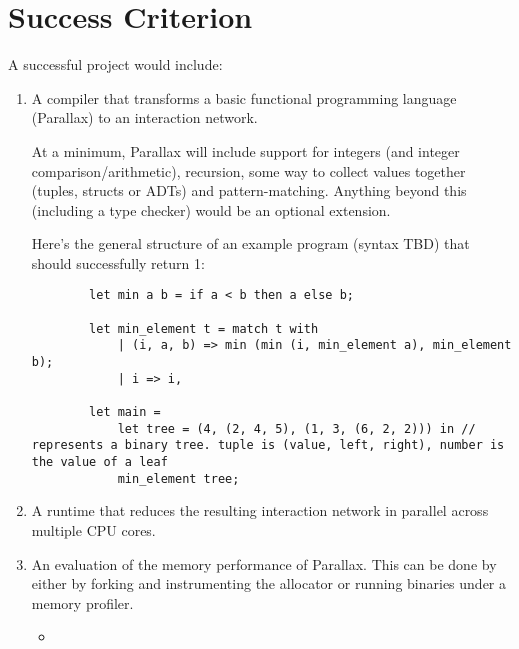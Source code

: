 \documentclass{article}
\newcommand{\Name}{Parallax}
\begin{document}
\section{Success Criterion}
A successful project would include:
\begin{enumerate}
    \item A compiler that transforms a basic functional programming language (\Name{}) to an interaction network.

    At a minimum, Parallax will include support for integers (and integer comparison/arithmetic), recursion, some way to collect values together (tuples, structs or ADTs) and pattern-matching. Anything beyond this (including a type checker) would be an optional extension.
    
    Here's the general structure of an example program (syntax TBD) that should successfully return 1:

    \begin{verbatim}
        let min a b = if a < b then a else b;
    
        let min_element t = match t with
            | (i, a, b) => min (min (i, min_element a), min_element b);
            | i => i,
    
        let main =
            let tree = (4, (2, 4, 5), (1, 3, (6, 2, 2))) in // represents a binary tree. tuple is (value, left, right), number is the value of a leaf
            min_element tree;
    \end{verbatim}
    
    \item A runtime that reduces the resulting interaction network in parallel across multiple CPU cores.
    \item An evaluation of the memory performance of \Name{}. This can be done by either by forking and instrumenting the allocator or running binaries under a memory profiler.

    \begin{itemize}
        \item 
    \end{itemize}
\end{enumerate}
\end{document}
